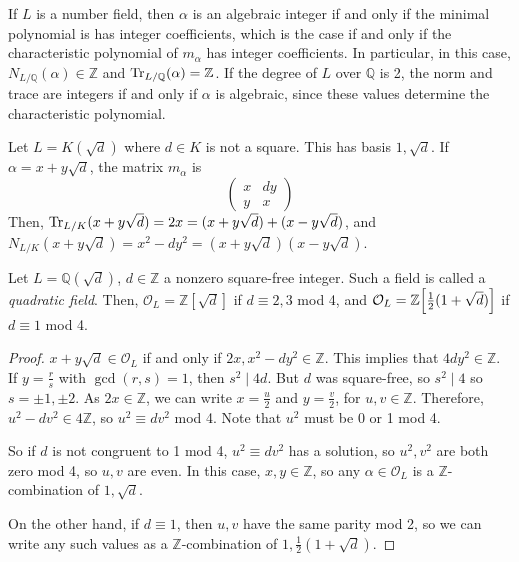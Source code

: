 If \( L \) is a number field, then \( \alpha \) is an algebraic integer if and only if the minimal polynomial is has integer coefficients, which is the case if and only if the characteristic polynomial of \( m_\alpha \) has integer coefficients.
In particular, in this case, \( N_{L/\mathbb Q}(\alpha) \in \mathbb Z \) and \( \Tr_{L/\mathbb Q}(\alpha) = \mathbb Z \).
If the degree of \( L \) over \( \mathbb Q \) is 2, the norm and trace are integers if and only if \( \alpha \) is algebraic, since these values determine the characteristic polynomial.
\begin{example}
    Let \( L = K(\sqrt{d}) \) where \( d \in K \) is not a square.
    This has basis \( 1, \sqrt d \).
    If \( \alpha = x + y\sqrt d \), the matrix \( m_\alpha \) is
    \[ \begin{pmatrix}
        x & dy \\
        y & x
    \end{pmatrix} \]
    Then, \( \Tr_{L/K}(x+y\sqrt d) = 2x = (x+y\sqrt d) + (x-y\sqrt d) \), and \( N_{L/K}(x+y\sqrt d) = x^2 - dy^2 = (x+y\sqrt d)(x - y\sqrt d) \).
\end{example}
\begin{lemma}
    Let \( L = \mathbb Q(\sqrt{d}) \), \( d \in \mathbb Z \) a nonzero square-free integer.
    Such a field is called a \emph{quadratic field}.
    Then, \( \mathcal O_L = \mathbb Z[\sqrt d] \) if \( d \equiv 2, 3 \) mod 4, and \( \mathcal O_L = \mathbb Z\qty[\frac{1}{2}(1+\sqrt d)] \) if \( d \equiv 1 \) mod 4.
\end{lemma}
\begin{proof}
    \( x + y \sqrt d \in \mathcal O_L \) if and only if \( 2x, x^2 - dy^2 \in \mathbb Z \).
    This implies that \( 4 dy^2 \in \mathbb Z \).
    If \( y = \frac{r}{s} \) with \( \gcd(r,s) = 1 \), then \( s^2 \mid 4d \).
    But \( d \) was square-free, so \( s^2 \mid 4 \) so \( s = \pm 1, \pm 2 \).
    As \( 2x \in \mathbb Z \), we can write \( x = \frac{u}{2} \) and \( y = \frac{v}{2} \), for \( u, v \in \mathbb Z \).
    Therefore, \( u^2 - dv^2 \in 4\mathbb Z \), so \( u^2 \equiv dv^2 \) mod 4.
    Note that \( u^2 \) must be 0 or 1 mod 4.

    So if \( d \) is not congruent to 1 mod 4, \( u^2 \equiv dv^2 \) has a solution, so \( u^2, v^2 \) are both zero mod 4, so \( u, v \) are even.
    In this case, \( x, y \in \mathbb Z \), so any \( \alpha \in \mathcal O_L \) is a \( \mathbb Z \)-combination of \( 1, \sqrt d \).

    On the other hand, if \( d \equiv 1 \), then \( u, v \) have the same parity mod 2, so we can write any such values as a \( \mathbb Z \)-combination of \( 1, \frac{1}{2}(1+\sqrt d) \).
\end{proof}
